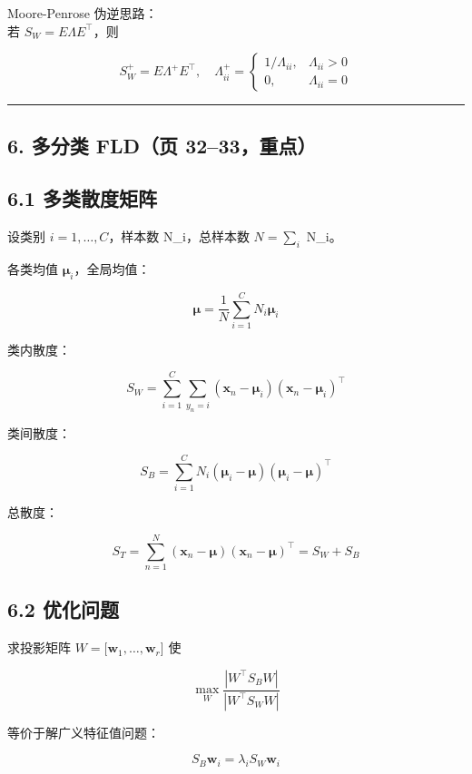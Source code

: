 \documentclass[
]{article}
\begin{document}
{{Moore-Penrose 伪逆思路：\\
若 \(S_W=E\Lambda E^\top\)，则

\[
S_W^+=E\Lambda^+E^\top,\quad
\Lambda^+_{ii}=
\begin{cases}
1/\Lambda_{ii}, & \Lambda_{ii}>0\\
0, & \Lambda_{ii}=0
\end{cases}
\]

\begin{center}\rule{0.5\linewidth}{0.5pt}\end{center}

\subsection{6. 多分类 FLD（页
32--33，重点）}\label{ux591aux5206ux7c7b-fldux9875-3233ux91cdux70b9}

\subsection{6.1
多类散度矩阵}\label{ux591aux7c7bux6563ux5ea6ux77e9ux9635}

设类别 \(i=1,\dots,C\)，样本数 N\_i，总样本数 \(N=\sum_i\) N\_i。

各类均值 \(\boldsymbol{\mu}_i\)，全局均值：

\[
\boldsymbol{\mu}=\frac{1}{N}\sum_{i=1}^{C}N_i\boldsymbol{\mu}_i
\]

类内散度：

\[
S_W=\sum_{i=1}^{C}\sum_{y_n=i}
(\mathbf{x}_n-\boldsymbol{\mu}_i)(\mathbf{x}_n-\boldsymbol{\mu}_i)^\top
\]

类间散度：

\[
S_B=\sum_{i=1}^{C}N_i
(\boldsymbol{\mu}_i-\boldsymbol{\mu})
(\boldsymbol{\mu}_i-\boldsymbol{\mu})^\top
\]

总散度：

\[
S_T=
\sum_{n=1}^{N}(\mathbf{x}_n-\boldsymbol{\mu})(\mathbf{x}_n-\boldsymbol{\mu})^\top
=S_W+S_B
\]

\subsection{6.2 优化问题}\label{ux4f18ux5316ux95eeux9898}

求投影矩阵 \(W=[\mathbf{w}_1,\dots,\mathbf{w}_r\){]} 使

\[
\max_W \frac{|W^\top S_B W|}{|W^\top S_W W|}
\]

等价于解广义特征值问题：

\[
S_B\mathbf{w}_i=\lambda_i S_W\mathbf{w}_i
\]

}}
\end{document}
